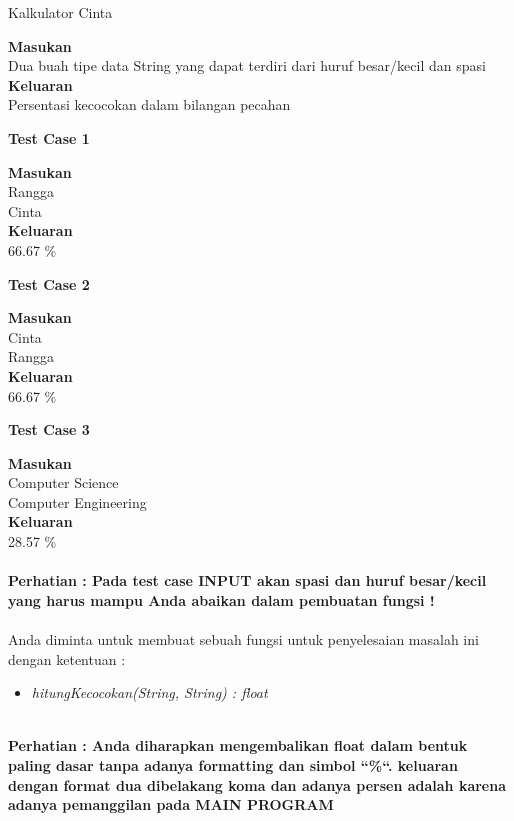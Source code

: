 \begin{permasalahan}{Kalkulator Cinta}
\begin{enumerate}
	\end{enumerate}
	\textbf{Masukan}\\
	Dua buah tipe data String yang dapat terdiri dari huruf besar/kecil dan spasi\\
	\textbf{Keluaran}\\
	Persentasi kecocokan dalam bilangan pecahan\\
	\begin{center}
	\textbf{Test Case 1}\\
	\end{center}
	\textbf{Masukan}\\
	Rangga\\
	Cinta\\
	\textbf{Keluaran}\\
	66.67 \%
	
	\begin{center}
	\textbf{Test Case 2}\\
	\end{center}
	\textbf{Masukan}\\
	Cinta\\
	Rangga\\
	\textbf{Keluaran}\\
	66.67 \%

	\begin{center}
	\textbf{Test Case 3}\\
	\end{center}
	\textbf{Masukan}\\
	Computer Science\\
	Computer Engineering\\
	\textbf{Keluaran}\\
	28.57 \% \\\\

		\textbf{Perhatian : Pada test case INPUT akan  spasi dan huruf besar/kecil yang harus mampu Anda abaikan dalam pembuatan fungsi !} \\\\
	
	Anda diminta untuk membuat sebuah fungsi untuk penyelesaian masalah ini dengan ketentuan : \\
	\begin{itemize}
		\item \textit{hitungKecocokan(String, String) : float}\\\\
	\end{itemize}
	
	
	\textbf{Perhatian : Anda diharapkan mengembalikan float dalam bentuk paling dasar tanpa adanya formatting dan simbol ``\%``. keluaran dengan format dua dibelakang koma dan adanya persen adalah karena adanya pemanggilan pada MAIN PROGRAM}
	
\end{permasalahan}



